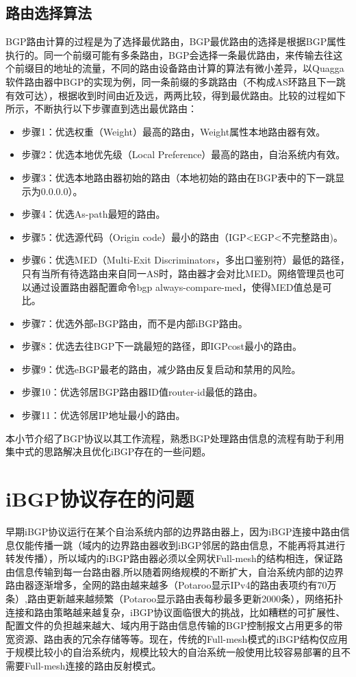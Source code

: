 \subsection{路由选择算法}
BGP路由计算\cite{DianeTeare2016CCNP}的过程是为了选择最优路由，BGP最优路由的选择是根据BGP属性执行的。同一个前缀可能有多条路由，BGP会选择一条最优路由，来传输去往这个前缀目的地址的流量，不同的路由设备路由计算的算法有微小差异，以Quagga软件路由器中BGP的实现为例，同一条前缀的多跳路由（不构成AS环路且下一跳有效可达），根据收到时间由近及远，两两比较，得到最优路由。比较的过程如下所示，不断执行以下步骤直到选出最优路由：

\begin{itemize}
    \item 步骤1：优选权重（Weight）最高的路由，Weight属性本地路由器有效。
    \item 步骤2：优选本地优先级（Local Preference）最高的路由，自治系统内有效。
    \item 步骤3：优选本地路由器初始的路由（本地初始的路由在BGP表中的下一跳显示为0.0.0.0）。
    \item 步骤4：优选As-path最短的路由。
    \item 步骤5：优选源代码（Origin code）最小的路由（IGP<EGP<不完整路由)。
    \item 步骤6：优选MED（Multi-Exit Discriminators，多出口鉴别符）最低的路径，只有当所有待选路由来自同一AS时，路由器才会对比MED。网络管理员也可以通过设置路由器配置命令bgp always-compare-med，使得MED值总是可比。
    \item 步骤7：优选外部eBGP路由，而不是内部iBGP路由。
    \item 步骤8：优选去往BGP下一跳最短的路径，即IGPcost最小的路由。
    \item 步骤9：优选eBGP最老的路由，减少路由反复启动和禁用的风险。
    \item 步骤10：优选邻居BGP路由器ID值router-id最低的路由。
    \item 步骤11：优选邻居IP地址最小的路由。
\end{itemize}

本小节介绍了BGP协议以其工作流程，熟悉BGP处理路由信息的流程有助于利用集中式的思路解决且优化iBGP存在的一些问题。

\section{iBGP协议存在的问题}

早期iBGP协议运行在某个自治系统内部的边界路由器上，因为iBGP连接中路由信息仅能传播一跳（域内的边界路由器收到iBGP邻居的路由信息，不能再将其进行转发传播），所以域内的iBGP路由器必须以全网状Full-mesh的结构相连，保证路由信息传输到每一台路由器,所以随着网络规模的不断扩大，自治系统内部的边界路由器逐渐增多，全网的路由越来越多（Potaroo\cite{bgptabledata}显示IPv4的路由表项约有70万条）,路由更新越来越频繁（Potaroo显示路由表每秒最多更新2000条），网络拓扑连接和路由策略越来越复杂，iBGP协议面临很大的挑战\cite{ibgp2016infocom}，比如糟糕的可扩展性、配置文件的负担越来越大、域内用于路由信息传输的BGP控制报文占用更多的带宽资源、路由表的冗余存储等等。现在，传统的Full-mesh模式的iBGP结构仅应用于规模比较小的自治系统内，规模比较大的自治系统一般使用比较容易部署的且不需要Full-mesh连接的路由反射\cite{rfc2796}模式。

